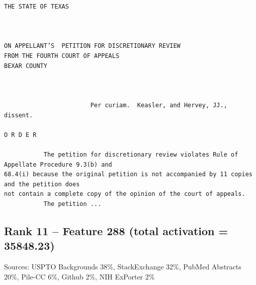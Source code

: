 \begin{verbatim}
THE STATE OF TEXAS



ON APPELLANT’S  PETITION FOR DISCRETIONARY REVIEW
FROM THE FOURTH COURT OF APPEALS
BEXAR COUNTY



                        Per curiam.  Keasler, and Hervey, JJ., dissent.

O R D E R 

           The petition for discretionary review violates Rule of Appellate Procedure 9.3(b) and
68.4(i) because the original petition is not accompanied by 11 copies and the petition does
not contain a complete copy of the opinion of the court of appeals.
           The petition ...

\end{verbatim}

\subsection*{Rank 11 -- Feature 288 (total activation = 35848.23)}

Sources: USPTO Backgrounds 38\%, StackExchange 32\%, PubMed Abstracts 20\%, Pile-CC 6\%, Github 2\%, NIH ExPorter 2\%

